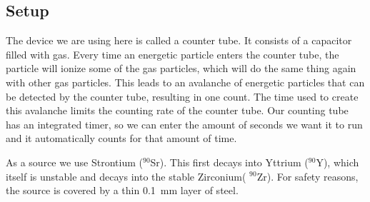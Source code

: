 \subsection{Setup}
The device we are using here is called a counter tube.
It consists of a capacitor filled with gas.
Every time an energetic particle enters the counter tube, the particle will ionize some of the gas particles, which will do the same thing again with other gas particles.
This leads to an avalanche of energetic particles that can be detected by the counter tube, resulting in one count. 
The time used to create this avalanche limits the counting rate of the counter tube.
Our counting tube has an integrated timer, so we can enter the amount of seconds we want it to run and it automatically counts for that amount of time.

As a source we use Strontium ($^{90}$Sr).
This first decays into Yttrium ($^{90}$Y), which itself is unstable and decays into the stable Zirconium( $^{90}$Zr).
For safety reasons, the source is covered by a thin \SI{0.1}{\milli\meter} layer of steel.

